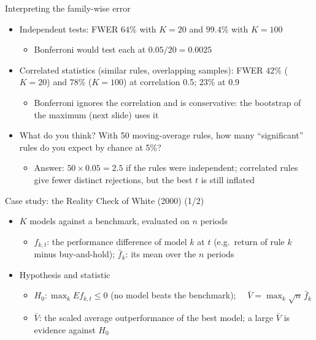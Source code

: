 \begin{frame}{Interpreting the family-wise error}
\itemsize{\small}
\begin{itemize}
    \item Independent tests: FWER $64\%$ with $K = 20$ and $99.4\%$ with $K = 100$
    \begin{itemize}
        \item Bonferroni would test each at $0.05/20 = 0.0025$
    \end{itemize}
    \item Correlated statistics (similar rules, overlapping samples): FWER $42\%$ ($K = 20$) and $78\%$ ($K = 100$) at correlation 0.5; $23\%$ at 0.9
    \begin{itemize}
        \item Bonferroni ignores the correlation and is conservative: the bootstrap of the maximum (next slide) uses it
    \end{itemize}
    \item What do you think? With 50 moving-average rules, how many ``significant'' rules do you expect by chance at 5\%?
    \begin{itemize}
        \item Answer: $50 \times 0.05 = 2.5$ if the rules were independent; correlated rules give fewer distinct rejections, but the best $t$ is still inflated
    \end{itemize}
\end{itemize}
\end{frame}

\begin{frame}{Case study: the Reality Check of White (2000) (1/2)}
\itemsize{\small}
\begin{itemize}
    \item $K$ models against a benchmark, evaluated on $n$ periods 
    \begin{itemize}
        \item $f_{k,t}$: the performance difference of model $k$ at $t$ (e.g.\ return of rule $k$ minus buy-and-hold); $\bar f_k$: its mean over the $n$ periods
    \end{itemize}
    \item Hypothesis and statistic
    \begin{itemize}
        \item $H_0: \max_k E f_{k,t} \le 0$ (no model beats the benchmark); $\quad \bar V = \max_k \sqrt{n}\,\bar f_k$
        \item $\bar V$: the scaled average outperformance of the best model; a large $\bar V$ is evidence against $H_0$
    \end{itemize}
\end{itemize}
\end{frame}

